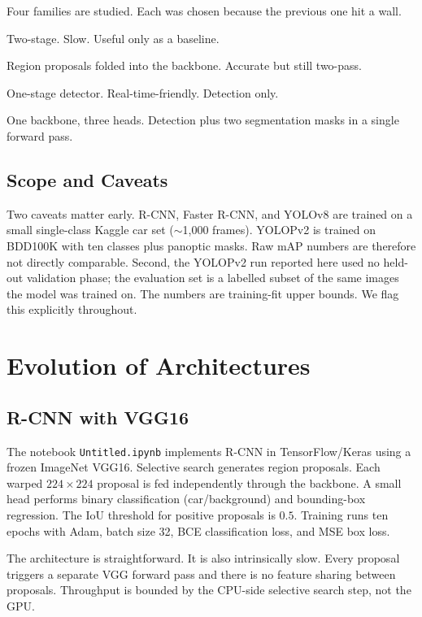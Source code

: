 \documentclass[12pt,a4paper]{report}
\begin{document}
Four families are studied. Each was chosen because the previous one hit a wall.

\begin{description}[leftmargin=*,style=nextline]
    \item[R-CNN (VGG16 + selective search).] Two-stage. Slow. Useful only as a baseline.
    \item[Faster R-CNN (ResNet50-FPN).] Region proposals folded into the backbone. Accurate but still two-pass.
    \item[YOLOv8n.] One-stage detector. Real-time-friendly. Detection only.
    \item[YOLOPv2.] One backbone, three heads. Detection plus two segmentation masks in a single forward pass.
\end{description}

\section{Scope and Caveats}

Two caveats matter early. R-CNN, Faster R-CNN, and YOLOv8 are trained on a small single-class Kaggle car set ($\sim$1{,}000 frames). YOLOPv2 is trained on BDD100K with ten classes plus panoptic masks. Raw mAP numbers are therefore not directly comparable. Second, the YOLOPv2 run reported here used no held-out validation phase; the evaluation set is a labelled subset of the same images the model was trained on. The numbers are training-fit upper bounds. We flag this explicitly throughout.


\chapter{Evolution of Architectures}

\section{R-CNN with VGG16}

The notebook \texttt{Untitled.ipynb} implements R-CNN in TensorFlow/Keras using a frozen ImageNet VGG16. Selective search generates region proposals. Each warped $224 \times 224$ proposal is fed independently through the backbone. A small head performs binary classification (car/background) and bounding-box regression. The IoU threshold for positive proposals is $0.5$. Training runs ten epochs with Adam, batch size 32, BCE classification loss, and MSE box loss.

The architecture is straightforward. It is also intrinsically slow. Every proposal triggers a separate VGG forward pass and there is no feature sharing between proposals. Throughput is bounded by the CPU-side selective search step, not the GPU.
\end{document}
